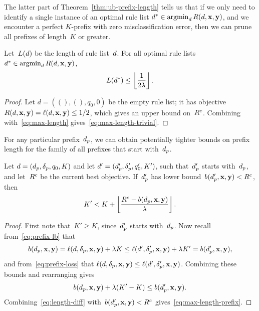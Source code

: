 The latter part of Theorem~\ref{thm:ub-prefix-length} tells us that
if we only need to identify a single instance of an optimal rule list
${d^* \in \operatorname*{argmin}_{d} R({d}, \mathbf{x}, \mathbf{y})}$, and we encounter a perfect
$K$-prefix with zero misclassification error, then we can prune all
prefixes of length~$K$ or greater.

\begin{corollary}
\label{cor:ub-prefix-length}
Let~$L({d})$ be the length of rule list~${d}$.
%
For all optimal rule lists ${d^* \in \operatorname*{argmin}_{d} R({d}, \mathbf{x}, \mathbf{y})}$,
\begin{align}
L(\OptimalRL) \le \left\lfloor \frac{1}{2\Reg} \right\rfloor.
\label{eq:max-length-trivial}
\end{align}
\end{corollary}

\begin{proof}
Let ${d = ((), (), q_0, 0)}$ be the empty rule list;
it has objective ${R({d}, \mathbf{x}, \mathbf{y}) = \ell({d}, \mathbf{x}, \mathbf{y}) \le 1/2}$,
which gives an upper bound on~${R^c}$.
%
Combining with~\eqref{eq:max-length} gives~\eqref{eq:max-length-trivial}.
\end{proof}

For any particular prefix~$d_p$, we can obtain potentially tighter bounds on
prefix length for the family of all prefixes that start with~$d_p$.

\begin{theorem}
\label{thm:ub-prefix-specific}
Let ${{d} = (d_p, \delta_p, q_0, K)}$
and let ${{d}' = (d_p', \delta_p', q_0', K')}$,
such that~$d_p'$ starts with~$d_p$,
and let~${R^c}$ be the current best objective.
%
If~$d_p'$ has lower bound~${b(d_p', \mathbf{x}, \mathbf{y}) < {R^c}}$, then
\begin{align}
K' < K + \left\lfloor \frac{\CurrentObj - b(\Prefix, \x, \y)}{\Reg} \right\rfloor.
\label{eq:max-length-prefix}
\end{align}
\end{theorem}

\begin{proof}
First note that~${K' \ge K}$, since~$d_p'$ starts with~$d_p$.
%
Now recall from~\eqref{eq:prefix-lb} that
%
\begin{align}
b(\Prefix, \x, \y) = \Loss(\RL, \Labels, \x, \y) + \Reg K
\le \Loss(\RL', \Labels', \x, \y) + \Reg K' = b(\Prefix', \x, \y),
\end{align}
%
and from~\eqref{eq:prefix-loss} that
${\ell({d}, \delta_p, \mathbf{x}, \mathbf{y}) \le \ell({d}', \delta_p', \mathbf{x}, \mathbf{y})}$.
%
Combining these bounds and rearranging gives
\begin{align}
b(\Prefix, \x, \y) + \Reg (K' - K) \le b(\Prefix', \x, \y).
\label{eq:length-diff}
\end{align}
Combining~\eqref{eq:length-diff} with~${b(d_p', \mathbf{x}, \mathbf{y}) < {R^c}}$
gives~\eqref{eq:max-length-prefix}.
\end{proof}

